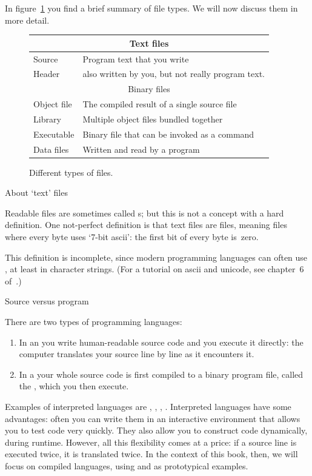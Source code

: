 In figure~\ref{fig:file-types} you find a brief summary of file types.
We will now discuss them in more detail.

\begin{figure}[ht]
  \begin{tabular}{ll}
    \toprule
    \multicolumn{2}{c}{Text files}\\
    \midrule
    Source&Program text that you write\\
    Header&also written by you, but not really program text.\\
    \midrule
    \multicolumn{2}{c}{Binary files}\\
    \midrule
    Object file&The compiled result of a single source file\\
    Library&Multiple object files bundled together\\
    Executable&Binary file that can be invoked as a command\\
    Data files&Written and read by a program\\
    \midrule
  \end{tabular}
  \caption{Different types of files.}
  \label{fig:file-types}
\end{figure}

 {About `text' files}

Readable files are sometimes called s;
but this is not a concept with a hard definition.
One not-perfect definition is that text files are  files,
meaning files where every byte uses `7-bit ascii': the first bit of every
byte is~zero.

This definition is incomplete, since modern programming languages
can often use , at least in character strings.
(For a tutorial on ascii and unicode, see chapter~6
of~\cite{Eijkhout:TeXscience}.)

 {Source versus program}

There are two types of programming languages:
\begin{enumerate}
\item In an  you write
  human-readable source code and you execute it directly: the computer
  translates your source line by line as it encounters it. 
\item In a  your whole source code
  is first compiled to a binary program file,
  called the ,
  which you then execute.
\end{enumerate}
Examples of interpreted languages are ,
, , .
Interpreted languages have some advantages: often you can write them
in an interactive environment that allows you to test code very
quickly. They also allow you to construct code dynamically, during
runtime. However, all this flexibility comes at a price: if a source
line is executed twice, it is translated twice. In the context of this
book, then, we will focus on compiled languages, using 
and  as prototypical examples.

